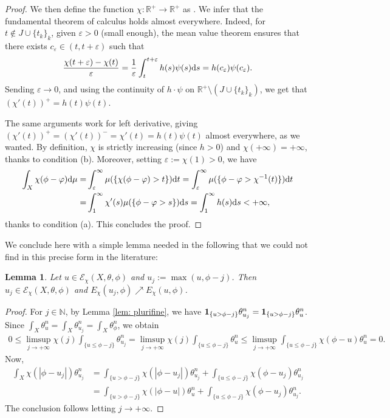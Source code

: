 \documentclass[pdftex]{sigma}
\numberwithin{equation}{section}
\newtheorem{Lemma}[Theorem]{Lemma}
\theoremstyle{plain}
\newcommand{\R}{\mathbb R}
\newcommand{\N}{\mathbb N}
\newcommand{\id}{{\bf 1}}
\begin{document}
\begin{proof}
We then define the function $\chi\colon \R^+\rightarrow \R^+$ as . We infer that the fundamental theorem of calculus holds almost everywhere. Indeed, for $t\notin J\cup \{t_k\}_k$, given $\varepsilon>0$ (small enough), the mean value theorem ensures that there exists $c_\varepsilon \in (t, t+\varepsilon)$ such that
\[\frac{\chi (t+\varepsilon)-\chi (t)}{\varepsilon} = \frac{1}{\varepsilon} \int_t^{t+\varepsilon} h(s) \psi(s) {\rm d}s = h(c_\varepsilon) \psi(c_\varepsilon).\]
Sending $\varepsilon\to 0$, and using the continuity of $h\cdot \psi$ on $\R^+\setminus (J\cup \{t_k\}_k)$, we get that $(\chi'(t))^+=h(t)\psi(t)$.

The same arguments work for left derivative, giving $(\chi'(t))^+=(\chi'(t))^-=\chi'(t)=h(t)\psi(t)$ almost everywhere, as we wanted.
By definition, $\chi$ is strictly increasing (since $h> 0$) and $\chi(+\infty)=+\infty$, thanks to condition (b). Moreover, setting $\varepsilon:=\chi (1)>0$, we have
\begin{align*}
\int_X \chi (\phi-\varphi) {\rm d}\mu = & \int_{\varepsilon}^\infty \mu(\{ \chi (\phi-\varphi) >t\}) {\rm d}t=\int_{\varepsilon}^\infty \mu(\{ \phi-\varphi >\chi^{-1}(t)\}) {\rm d}t\\
=& \int_{1}^\infty \chi'(s) \mu(\{ \phi-\varphi >s\}) {\rm d}s= \int_{1}^\infty h(s) {\rm d}s <+\infty,
\end{align*}
thanks to condition (a). This concludes the proof.
\end{proof}

We conclude here with a simple lemma needed in the following that we could not find in this precise form in the literature:

\begin{Lemma}\label{energy increases}
 Let $u\in \mathcal{E}_{\chi}(X,\theta,\phi)$ and $u_j:=\max (u,\phi -j)$. Then $u_j \in \mathcal{E}_{\chi}(X,\theta,\phi)$ and $E_{\chi}(u_j,\phi) \nearrow E_{\chi}(u,\phi)$.
\end{Lemma}
\begin{proof}
 For $j\in \N$, by Lemma \ref{lem: plurifine}, we have $\id_{\{u>\phi -j\}} \theta_{u_j}^n= \id_{\{u>\phi-j\}} \theta_{u}^n$. Since $\int_X \theta_{u}^n=\int_X \theta_{u_j}^n=\int_X \theta_\phi^n$, we obtain
\begin{align*}
0\leq \limsup_{j\to +\infty} \chi(j)\int_{\{u\leq \phi-j\}}\!\theta_{u_j}^n = \limsup_{j\to +\infty} \chi(j)\int_{\{u\leq \phi-j\}}\!\theta_{u}^n
\leq \limsup_{j\to +\infty} \int_{\{u\leq\phi-j\}}\! \chi (\phi-u)\theta_{u}^n =0.
\end{align*}
Now,
\begin{align*}
\int_X \chi (|\phi-u_j|) \theta_{u_j}^n &= \int_{\{ u > \phi-j\}} \chi (|\phi-u_j|) \theta_{u_j}^n+ \int_{\{ u \leq \phi-j\}} \chi (\phi-u_j) \theta_{u_j}^n \\
 &= \int_{\{ u > \phi-j\}} \chi (|\phi-u|) \theta_{u}^n+ \int_{\{ u \leq \phi-j\}} \chi (\phi-u_j) \theta_{u_j}^n.
\end{align*}
The conclusion follows letting $j\rightarrow +\infty$.
\end{proof}
\end{document}
